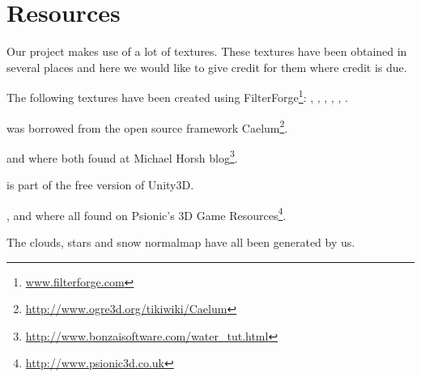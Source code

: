 \chapter{Resources}

Our project makes use of a lot of textures. These textures have been
obtained in several places and here we would like to give credit for
them where credit is due.

The following textures have been created using
FilterForge\footnote{\url{www.filterforge.com}}: ,
, ,
, ,
.

 was borrowed from the open source framework
Caelum\footnote{\url{http://www.ogre3d.org/tikiwiki/Caelum}}.

 and  where both
found at Michael Horsh blog\footnote{\url{
http://www.bonzaisoftware.com/water\_tut.html}}.

 is part of the free version of Unity3D.

,  and 
where all found on Psionic's 3D Game
Resources\footnote{\url{http://www.psionic3d.co.uk}}.

The clouds, stars and snow normalmap have all been generated by us.
